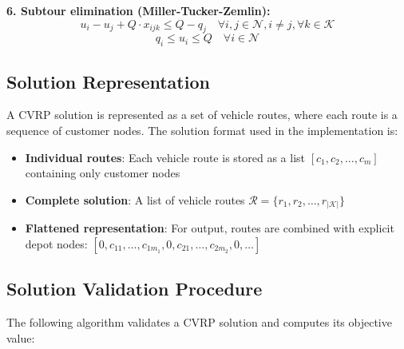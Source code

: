 \documentclass[a4paper,twoside]{article}
\begin{document}
\textbf{6. Subtour elimination (Miller-Tucker-Zemlin):}
\begin{equation}
u_i - u_j + Q \cdot x_{ijk} \leq Q - q_j \quad \forall i, j \in \mathcal{N}, i \neq j, \forall k \in \mathcal{K}
\end{equation}
\begin{equation}
q_i \leq u_i \leq Q \quad \forall i \in \mathcal{N}
\end{equation}

\subsection{Solution Representation}

A CVRP solution is represented as a set of vehicle routes, where each route is a sequence of customer nodes. The solution format used in the implementation is:

\begin{itemize}
    \item \textbf{Individual routes}: Each vehicle route is stored as a list $[c_1, c_2, \ldots, c_m]$ containing only customer nodes
    \item \textbf{Complete solution}: A list of vehicle routes $\mathcal{R} = \{r_1, r_2, \ldots, r_{|\mathcal{K}|}\}$
    \item \textbf{Flattened representation}: For output, routes are combined with explicit depot nodes: $[0, c_{11}, \ldots, c_{1m_1}, 0, c_{21}, \ldots, c_{2m_2}, 0, \ldots]$
\end{itemize}

\subsection{Solution Validation Procedure}

The following algorithm validates a CVRP solution and computes its objective value:
\end{document}
